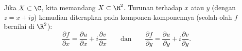 
Jika $X \subset \C$, kita memandang $X \subset \R^2$.
Turunan terhadap $x$ atau $y$ (dengan $z=x+iy$) kemudian diterapkan pada
komponen-komponennya (seolah-olah $f$ bernilai di $\R^2$):
\begin{equation*}
\frac{\partial f}{\partial x} = 
\frac{\partial u}{\partial x} + i
\frac{\partial v}{\partial x}
\qquad\text{dan}\qquad
\frac{\partial f}{\partial y} = 
\frac{\partial u}{\partial y} + i
\frac{\partial v}{\partial y} .
\end{equation*}
